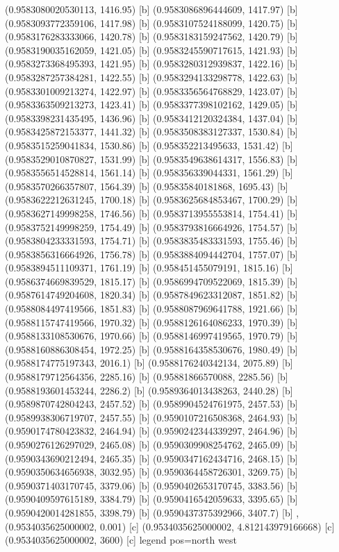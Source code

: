 {{{(0.9583080020530113, 1416.95) [b] 
(0.9583086896444609, 1417.97) [b] 
(0.9583093772359106, 1417.98) [b] 
(0.9583107524188099, 1420.75) [b] 
(0.9583176283333066, 1420.78) [b] 
(0.9583183159247562, 1420.79) [b] 
(0.9583190035162059, 1421.05) [b] 
(0.9583245590717615, 1421.93) [b] 
(0.9583273368495393, 1421.95) [b] 
(0.9583280312939837, 1422.16) [b] 
(0.9583287257384281, 1422.55) [b] 
(0.9583294133298778, 1422.63) [b] 
(0.9583301009213274, 1422.97) [b] 
(0.9583356564768829, 1423.07) [b] 
(0.9583363509213273, 1423.41) [b] 
(0.9583377398102162, 1429.05) [b] 
(0.9583398231435495, 1436.96) [b] 
(0.9583412120324384, 1437.04) [b] 
(0.9583425872153377, 1441.32) [b] 
(0.9583508383127337, 1530.84) [b] 
(0.9583515259041834, 1530.86) [b] 
(0.958352213495633, 1531.42) [b] 
(0.9583529010870827, 1531.99) [b] 
(0.9583549638614317, 1556.83) [b] 
(0.9583556514528814, 1561.14) [b] 
(0.958356339044331, 1561.29) [b] 
(0.9583570266357807, 1564.39) [b] 
(0.95835840181868, 1695.43) [b] 
(0.9583622212631245, 1700.18) [b] 
(0.9583625684853467, 1700.29) [b] 
(0.9583627149998258, 1746.56) [b] 
(0.9583713955553814, 1754.41) [b] 
(0.9583752149998259, 1754.49) [b] 
(0.9583793816664926, 1754.57) [b] 
(0.9583804233331593, 1754.71) [b] 
(0.9583835483331593, 1755.46) [b] 
(0.9583856316664926, 1756.78) [b] 
(0.9583884094442704, 1757.07) [b] 
(0.9583894511109371, 1761.19) [b] 
(0.958451455079191, 1815.16) [b] 
(0.9586374669839529, 1815.17) [b] 
(0.9586994709522069, 1815.39) [b] 
(0.9587614749204608, 1820.34) [b] 
(0.9587849623312087, 1851.82) [b] 
(0.9588084497419566, 1851.83) [b] 
(0.9588087969641788, 1921.66) [b] 
(0.9588115747419566, 1970.32) [b] 
(0.9588126164086233, 1970.39) [b] 
(0.9588133108530676, 1970.66) [b] 
(0.9588146997419565, 1970.79) [b] 
(0.9588160886308454, 1972.25) [b] 
(0.9588164358530676, 1980.49) [b] 
(0.9588174775197343, 2016.1) [b] 
(0.9588176240342134, 2075.89) [b] 
(0.9588179712564356, 2285.16) [b] 
(0.95881866570088, 2285.56) [b] 
(0.9588193601453244, 2286.2) [b] 
(0.9589364013438263, 2440.28) [b] 
(0.9589870742804243, 2457.52) [b] 
(0.9589904524761975, 2457.53) [b] 
(0.9589938306719707, 2457.55) [b] 
(0.9590107216508368, 2464.93) [b] 
(0.9590174780423832, 2464.94) [b] 
(0.9590242344339297, 2464.96) [b] 
(0.9590276126297029, 2465.08) [b] 
(0.9590309908254762, 2465.09) [b] 
(0.9590343690212494, 2465.35) [b] 
(0.9590347162434716, 2468.15) [b] 
(0.9590350634656938, 3032.95) [b] 
(0.9590364458726301, 3269.75) [b] 
(0.9590371403170745, 3379.06) [b] 
(0.9590402653170745, 3383.56) [b] 
(0.9590409597615189, 3384.79) [b] 
(0.9590416542059633, 3395.65) [b] 
(0.9590420014281855, 3398.79) [b] 
(0.9590437375392966, 3407.7) [b] 
},{(0.9534035625000002, 0.001) [c] 
(0.9534035625000002, 4.812143979166668) [c] 
(0.9534035625000002, 3600) [c] 
}}}{legend pos=north west}